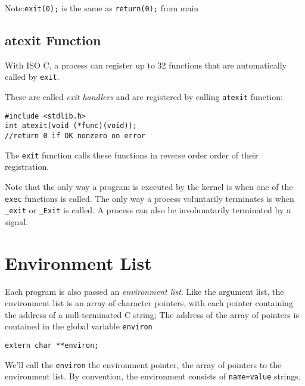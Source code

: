 \documentclass[a4paper,10pt]{book}
\begin{document}
Note:\verb|exit(0);| is the same as \verb|return(0);| from main
\subsection{atexit Function}
With ISO C, a process can register up to 32 functions that are automatically
called by \verb|exit|.

These are called \emph{exit handlers} and are registered by calling
\verb|atexit| function:
\begin{verbatim}
#include <stdlib.h>
int atexit(void (*func)(void));
//return 0 if OK nonzero on error
\end{verbatim}
The \verb|exit| function calls these functions in reverse order order of their
registration.

Note that the only way a program is executed by the kernel is when one of the
\verb|exec| functions is called. The only way a process voluntarily terminates
is when \verb|_exit| or \verb|_Exit| is called. A process can also be
involunatarily terminated by a signal.
\section{Environment List}
Each program is also passed an \emph{environment list}. Like the argument list,
the environment list is an array of character pointers, with each pointer
containing the address of a null-terminated C string; The address of the array
of pointers is contained in the global variable \verb|environ|
\begin{verbatim}
extern char **environ;
\end{verbatim}
We'll call the \verb|environ| the environment pointer, the array of pointers to
the environment list. By convention, the environment consists of
\verb|name=value| strings.
\end{document}

